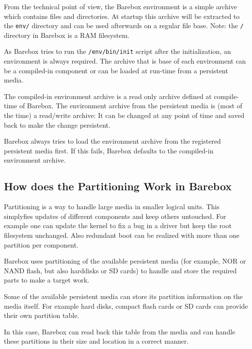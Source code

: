 From the technical point of view, the Barebox environment is a simple
archive which contains files and directories. At startup this archive will
be extracted to the \texttt{env/} directory and can be used afterwards on a
regular file base. Note: the \texttt{/} directory in Barebox is a RAM
filesystem.

As Barebox tries to run the \texttt{/env/bin/init} script after the
initialization, an environment is always required. The archive that is base of
each environment can be a compiled-in component or can be loaded at run-time
from a persistent media.

The compiled-in environment archive is a read only archive defined at
compile-time of Barebox. The environment archive from the persistent
media is (most of the time) a read/write archive: It can be changed at any
point of time and saved back to make the change persistent.

Barebox always tries to load the environment archive from the registered
persistent media first. If this fails, Barebox defaults to the compiled-in
environment archive.


\subsection{How does the Partitioning Work in Barebox}	\label{sec:bbpartitioning}

Partitioning is a way to handle large media in smaller logical units. This
simplyfies updates of different components and keep others untouched. For
example one can update the kernel to fix a bug in a driver but keep the
root filesystem unchanged. Also redundant boot can be realized with more than
one partition per component.

Barebox uses partitioning of the available persistent media (for example, NOR
or NAND flash, but also harddisks or SD cards) to handle and store the
required parts to make a target work.

Some of the available persistent media can store its partition information on
the media itself. For example hard disks, compact flash cards or SD cards can
provide their own partition table.

In this case, Barebox can read back this table from the media and can handle
these partitions in their size and location in a correct manner.

